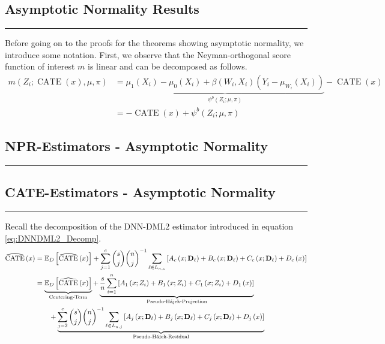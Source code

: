 \subsection{Asymptotic Normality Results}
\hrule

Before going on to the proofs for the theorems showing asymptotic normality, we introduce some notation.
First, we observe that the Neyman-orthogonal score function of interest $m$ is linear and can be decomposed as follows.
\begin{equation}
    \begin{aligned}
        m\left(Z_{i}; \operatorname{CATE}(x), \mu, \pi\right)
		  & = \underbrace{\mu_1\left(X_{i}\right) - \mu_0\left(X_{i}\right) + \beta\left(W_{i}, X_{i}\right)\left(Y_{i} - \mu_{W_{i}}\left(X_{i}\right)\right)}_{\psi^{b}\left(Z_{i}; \mu, \pi\right)} 
          - \operatorname{CATE}\left(x\right)\\
          & = - \operatorname{CATE}\left(x\right) + \psi^{b}\left(Z_{i}; \mu, \pi\right)
    \end{aligned}
\end{equation}  

\subsection{NPR-Estimators - Asymptotic Normality}
\hrule

\subsection{CATE-Estimators - Asymptotic Normality}
\hrule
Recall the decomposition of the DNN-DML2 estimator introduced in equation \ref{eq:DNNDML2_Decomp}.
\begin{equation}\label{eq:DNNDML2_Decomp}
    \begin{aligned}
        \widehat{\operatorname{CATE}}\left(x\right)
        & = \mathbb{E}_{D}\left[\widehat{\operatorname{CATE}}\left(x\right)\right] 
        + \sum_{j = 1}^{c} \binom{s}{j} \binom{n}{j}^{-1}\sum_{\ell \in L_{n,c}} \left[A_{c}\left(x; \mathbf{D}_{\ell}\right) + B_{c}\left(x; \mathbf{D}_{\ell}\right) + C_{c}\left(x; \mathbf{D}_{\ell}\right) + D_{c}\left(x\right)\right]\\
        & = \underbrace{\mathbb{E}_{D}\left[\widehat{\operatorname{CATE}}\left(x\right)\right]}_{\text{Centering-Term}}
        + \underbrace{\frac{s}{n} \sum_{i = 1}^{n} \left[A_{1}\left(x; Z_{i}\right) + B_{1}\left(x; Z_{i}\right) + C_{1}\left(x; Z_{i}\right) + D_{1}\left(x\right)\right]}_{\text{Pseudo-H\'ajek-Projection}}\\
        & \quad \quad + \underbrace{\sum_{j = 2}^{c} \binom{s}{j} \binom{n}{j}^{-1}\sum_{\ell \in L_{n,j}} \left[A_{j}\left(x; \mathbf{D}_{\ell}\right) + B_{j}\left(x; \mathbf{D}_{\ell}\right) + C_{j}\left(x; \mathbf{D}_{\ell}\right) + D_{j}\left(x\right)\right]}_{\text{Pseudo-H\'ajek-Residual}}\\
    \end{aligned}
\end{equation}